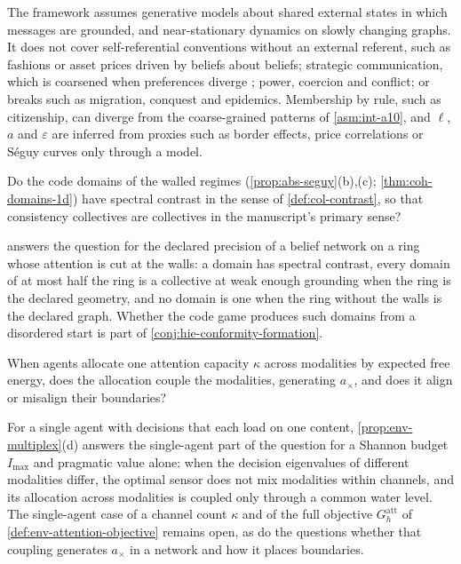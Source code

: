 The framework assumes generative models about shared external states in which messages are grounded, and near-stationary dynamics on slowly changing graphs. It does not cover self-referential conventions without an external referent, such as fashions or asset prices driven by beliefs about beliefs; strategic communication, which is coarsened when preferences diverge \citep{crawford1982strategic}; power, coercion and conflict; or breaks such as migration, conquest and epidemics. Membership by rule, such as citizenship, can diverge from the coarse-grained patterns of \cref{asm:int-a10}, and $\ell$, $a$ and $\varepsilon$ are inferred from proxies such as border effects, price correlations or S\'eguy curves only through a model.

\begin{openproblem}\label{open:abs-code-contrast}
Do the code domains of the walled regimes (\cref{prop:abs-seguy}(b),(c); \cref{thm:coh-domains-1d}) have spectral contrast in the sense of \cref{def:col-contrast}, so that consistency collectives are collectives in the manuscript's primary sense?
\end{openproblem}

 answers the question for the declared precision of a belief network on a ring whose attention is cut at the walls: a domain has spectral contrast, every domain of at most half the ring is a collective at weak enough grounding when the ring is the declared geometry, and no domain is one when the ring without the walls is the declared graph. Whether the code game produces such domains from a disordered start is part of \cref{conj:hie-conformity-formation}.

\begin{openproblem}\label{open:abs-attention}
When agents allocate one attention capacity $\kappa$ across modalities by expected free energy, does the allocation couple the modalities, generating $a_\times$, and does it align or misalign their boundaries?
\end{openproblem}

For a single agent with decisions that each load on one content, \cref{prop:env-multiplex}(d) answers the single-agent part of the question for a Shannon budget $I_{\max}$ and pragmatic value alone: when the decision eigenvalues of different modalities differ, the optimal sensor does not mix modalities within channels, and its allocation across modalities is coupled only through a common water level. The single-agent case of a channel count $\kappa$ and of the full objective $G^{\mathrm{att}}_h$ of \cref{def:env-attention-objective} remains open, as do the questions whether that coupling generates $a_\times$ in a network and how it places boundaries.

